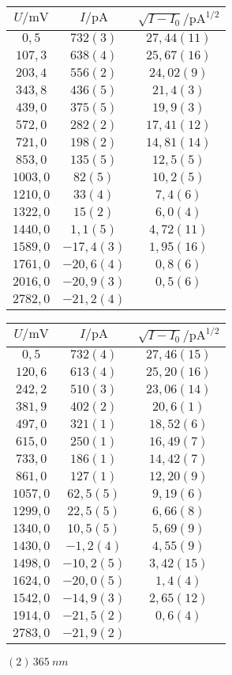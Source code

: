 \begin{figure}[htbp]
   \centering
\parbox{0.475\linewidth}{\centering
\begin{tabular}{c c c}
\hline$U / \unit{\milli\volt}$ & $I / \unit{\pico\ampere}$ & $\sqrt{I-I_0} / \unit{\pico\ampere\tothe{1/2}}$ \\ 
\hline
$0,5$ & $732(3)$ & $27,44(11)$ \\
$107,3$ & $638(4)$ & $25,67(16)$ \\
$203,4$ & $556(2)$ & $24,02(9)$ \\
$343,8$ & $436(5)$ & $21,4(3)$ \\
$439,0$ & $375(5)$ & $19,9(3)$ \\
$572,0$ & $282(2)$ & $17,41(12)$ \\
$721,0$ & $198(2)$ & $14,81(14)$ \\
$853,0$ & $135(5)$ & $12,5(5)$ \\
$1003,0$ & $82(5)$ & $10,2(5)$ \\
$1210,0$ & $33(4)$ & $7,4(6)$ \\
$1322,0$ & $15(2)$ & $6,0(4)$ \\
$1440,0$ & $1,1(5)$ & $4,72(11)$ \\
$1589,0$ & $-17,4(3)$ & $1,95(16)$ \\
$1761,0$ & $-20,6(4)$ & $0,8(6)$ \\
$2016,0$ & $-20,9(3)$ & $0,5(6)$ \\
$2782,0$ & $-21,2(4)$ &    \\
\hline\end{tabular}
\caption{$(1)\,\SI{365}{nm}$}
}\quad\parbox{0.475\linewidth}{\centering
\begin{tabular}{c c c}
\hline$U / \unit{\milli\volt}$ & $I / \unit{\pico\ampere}$ & $\sqrt{I-I_0} / \unit{\pico\ampere\tothe{1/2}}$ \\ 
\hline
$0,5$ & $732(4)$ & $27,46(15)$ \\
$120,6$ & $613(4)$ & $25,20(16)$ \\
$242,2$ & $510(3)$ & $23,06(14)$ \\
$381,9$ & $402(2)$ & $20,6(1)$ \\
$497,0$ & $321(1)$ & $18,52(6)$ \\
$615,0$ & $250(1)$ & $16,49(7)$ \\
$733,0$ & $186(1)$ & $14,42(7)$ \\
$861,0$ & $127(1)$ & $12,20(9)$ \\
$1057,0$ & $62,5(5)$ & $9,19(6)$ \\
$1299,0$ & $22,5(5)$ & $6,66(8)$ \\
$1340,0$ & $10,5(5)$ & $5,69(9)$ \\
$1430,0$ & $-1,2(4)$ & $4,55(9)$ \\
$1498,0$ & $-10,2(5)$ & $3,42(15)$ \\
$1624,0$ & $-20,0(5)$ & $1,4(4)$ \\
$1542,0$ & $-14,9(3)$ & $2,65(12)$ \\
$1914,0$ & $-21,5(2)$ & $0,6(4)$ \\
$2783,0$ & $-21,9(2)$ &    \\
\hline\end{tabular}
\caption{$(2)\,\SI{365}{nm}$}
}\end{figure}